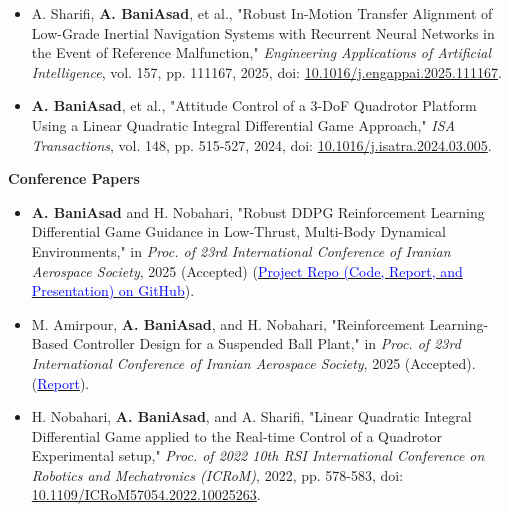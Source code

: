 \documentclass[12pt]{article}
\newcommand{\etal}{{et al.}}
\begin{document}
\begin{itemize} \itemsep -1pt %
	\item A. Sharifi, \textbf{A. BaniAsad}, et al., "Robust In-Motion Transfer Alignment of Low-Grade Inertial Navigation Systems with Recurrent Neural Networks in the Event of Reference Malfunction," \textit{Engineering Applications of Artificial Intelligence}, vol. 157, pp. 111167, 2025, doi: \href{https://doi.org/10.1016/j.engappai.2025.111167}{10.1016/j.engappai.2025.111167}.
	\item \textbf{A. BaniAsad}, et al., "Attitude Control of a 3-DoF Quadrotor Platform Using a Linear Quadratic Integral Differential Game Approach," \textit{ISA Transactions}, vol. 148, pp. 515-527, 2024, doi: \href{https://doi.org/10.1016/j.isatra.2024.03.005}{10.1016/j.isatra.2024.03.005}.
\end{itemize}

\noindent
{\bfseries Conference Papers}

\begin{itemize} \itemsep -1pt %
    \item \textbf{A. BaniAsad} and H. Nobahari, "Robust DDPG Reinforcement Learning Differential Game Guidance in Low-Thrust, Multi-Body Dynamical Environments," in \textit{Proc. of 23rd International Conference of Iranian Aerospace Society}, 2025 (Accepted) (\href{https://github.com/alibaniasad1999/DGDDPG}{\textcolor{blue}{Project Repo (Code, Report, and Presentation) on GitHub}}).
    \item M. Amirpour, \textbf{A. BaniAsad}, and H. Nobahari, "Reinforcement Learning-Based Controller Design for a Suspended Ball Plant," in \textit{Proc. of 23rd International Conference of Iranian Aerospace Society}, 2025 (Accepted).
   (\href{https://drive.google.com/file/d/18oinC3TNsnMand_cw5BN_Z3qxRAvds8u/view?usp=sharing}{\textcolor{blue}{Report}}).
	\item H. Nobahari, \textbf{A. BaniAsad}, and A. Sharifi, "Linear Quadratic Integral Differential Game applied to the Real-time Control of a Quadrotor Experimental setup," \textit{Proc. of 2022 10th RSI International Conference on Robotics and Mechatronics (ICRoM)}, 2022, pp. 578-583, doi: \href{https://doi.org/10.1109/ICRoM57054.2022.10025263}{10.1109/ICRoM57054.2022.10025263}.
\end{itemize}
\end{document}
